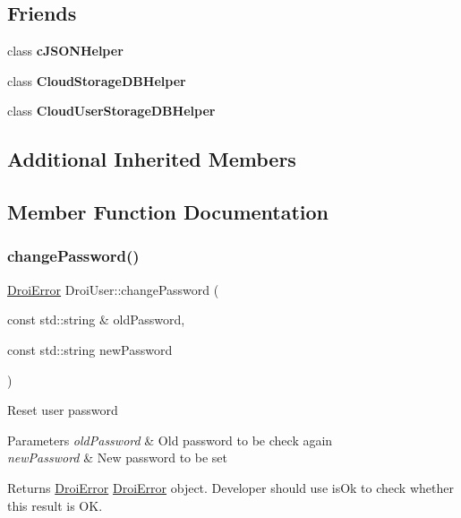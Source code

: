 \subsection*{Friends}
\begin{DoxyCompactItemize}
\item 
\mbox{\label{class_droi_user_a4c65f8b6629f95a05e4015663a0ba20a}} 
class {\bfseries c\+J\+S\+O\+N\+Helper}
\item 
\mbox{\label{class_droi_user_aba63ff5315e879e4b382bf84dcdcb3d1}} 
class {\bfseries Cloud\+Storage\+D\+B\+Helper}
\item 
\mbox{\label{class_droi_user_abd7e01d03f382b5c2fb8595e789490ca}} 
class {\bfseries Cloud\+User\+Storage\+D\+B\+Helper}
\end{DoxyCompactItemize}
\subsection*{Additional Inherited Members}


\subsection{Member Function Documentation}
\mbox{\label{class_droi_user_a3bea249ce5f0c182784979297e36c492}} 
\subsubsection{\texorpdfstring{change\+Password()}{changePassword()}}
{\footnotesize\ttfamily \hyperlink{class_droi_error}{Droi\+Error} Droi\+User\+::change\+Password (\begin{DoxyParamCaption}\item[{const std\+::string \&}]{old\+Password,  }\item[{const std\+::string}]{new\+Password }\end{DoxyParamCaption})}

Reset user password 
\begin{DoxyParams}{Parameters}
{\em old\+Password} & Old password to be check again \\
\hline
{\em new\+Password} & New password to be set \\
\hline
\end{DoxyParams}
\begin{DoxyReturn}{Returns}
\hyperlink{class_droi_error}{Droi\+Error} \hyperlink{class_droi_error}{Droi\+Error} object. Developer should use is\+Ok to check whether this result is OK. 
\end{DoxyReturn}
\mbox{\label{class_droi_user_a4a76d7e4ab2865f6ba2e01470091dca8}} 
